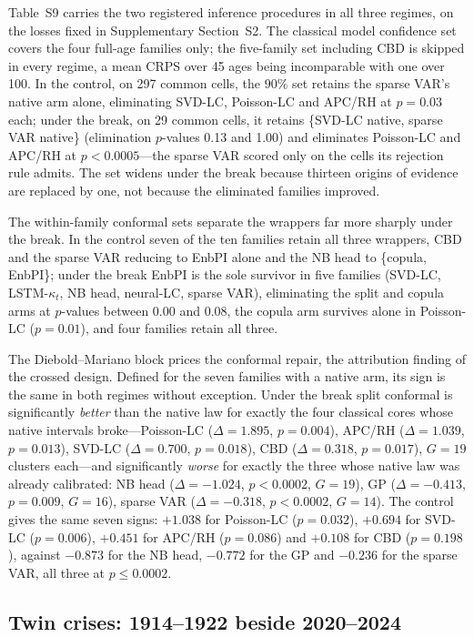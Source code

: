 Table~S9 carries the two registered inference procedures in all three regimes,
on the losses fixed in Supplementary Section~S2. The classical model confidence
set covers the four full-age families only; the five-family set including CBD is
skipped in every regime, a mean CRPS over 45 ages being incomparable with one
over 100. In the control, on 297 common cells, the 90\% set retains the sparse
VAR's native arm alone, eliminating SVD-LC, Poisson-LC and APC/RH at $p=0.03$
each; under the break, on 29 common cells, it retains \{SVD-LC native, sparse
VAR native\} (elimination $p$-values 0.13 and 1.00) and eliminates Poisson-LC
and APC/RH at $p<0.0005$---the sparse VAR scored only on the cells its rejection
rule admits. The set widens under the break because thirteen origins of evidence
are replaced by one, not because the eliminated families improved.

The within-family conformal sets separate the wrappers far more sharply under
the break. In the control seven of the ten families retain all three wrappers,
CBD and the sparse VAR reducing to EnbPI alone and the NB head to
\{copula, EnbPI\}; under the break EnbPI is the sole survivor in five families
(SVD-LC, LSTM-$\kappa_t$, NB head, neural-LC, sparse VAR), eliminating the split
and copula arms at $p$-values between 0.00 and 0.08, the copula arm survives
alone in Poisson-LC ($p=0.01$), and four families retain all three.

The Diebold--Mariano block prices the conformal repair, the attribution finding
of the crossed design. Defined for the seven families with a native arm, its
sign is the same in both regimes without exception. Under the break split
conformal is significantly \emph{better} than the native law for exactly the
four classical cores whose native intervals broke---Poisson-LC ($\Delta=1.895$,
$p=0.004$), APC/RH ($\Delta=1.039$, $p=0.013$), SVD-LC ($\Delta=0.700$,
$p=0.018$), CBD ($\Delta=0.318$, $p=0.017$), $G=19$ clusters each---and
significantly \emph{worse} for exactly the three whose native law was already
calibrated: NB head ($\Delta=-1.024$, $p<0.0002$, $G=19$), GP ($\Delta=-0.413$,
$p=0.009$, $G=16$), sparse VAR ($\Delta=-0.318$, $p<0.0002$, $G=14$). The
control gives the same seven signs: $+1.038$ for Poisson-LC ($p=0.032$),
$+0.694$ for SVD-LC ($p=0.006$), $+0.451$ for APC/RH ($p=0.086$) and $+0.108$
for CBD ($p=0.198$), against $-0.873$ for the NB head, $-0.772$ for the GP and
$-0.236$ for the sparse VAR, all three at $p\le0.0002$.

\subsection{Twin crises: 1914--1922 beside 2020--2024}

